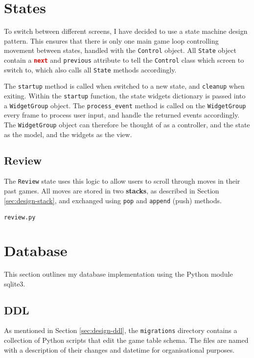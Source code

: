 \documentclass[../main/main.tex]{subfiles}
\begin{document}
\section{States}
To switch between different screens, I have decided to use a state machine design pattern. This ensures that there is only one main game loop controlling movement between states, handled with the \lstinline{Control} object. All \lstinline{State} object contain a \lstinline[language=json]{next} and \lstinline{previous} attribute to tell the \lstinline{Control} class which screen to switch to, which also calls all \lstinline{State} methods accordingly.

The \lstinline{startup} method is called when switched to a new state, and \lstinline{cleanup} when exiting. Within the \lstinline{startup} function, the state widgets dictionary is passed into a \lstinline{WidgetGroup} object. The \lstinline{process_event} method is called on the \lstinline{WidgetGroup} every frame to process user input, and handle the returned events accordingly. The \lstinline{WidgetGroup} object can therefore be thought of as a controller, and the state as the model, and the widgets as the view.

\subsection{Review}
\label{sec:review}
The \lstinline{Review} state uses this logic to allow users to scroll through moves in their past games. All moves are stored in two \textbf{stacks}, as described in Section \ref{sec:design-stack}, and exchanged using \lstinline{pop} and \lstinline{append} (push) methods.

\noindent\verb|review.py|


\section{Database}
This section outlines my database implementation using the Python module sqlite3.

\subsection{DDL}
\label{sec:migrations}
As mentioned in Section \ref{sec:design-ddl}, the \lstinline{migrations} directory contains a collection of Python scripts that edit the game table schema. The files are named with a description of their changes and datetime for organisational purposes.
\end{document}
